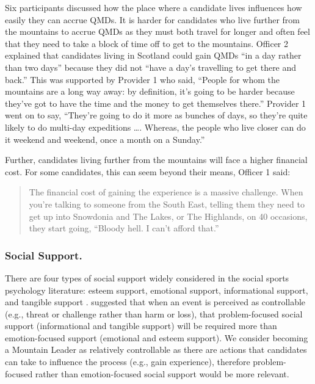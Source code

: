 \documentclass[
  12pt,
  a4paper,
]{book}
\begin{document}
Six participants discussed how the place where a candidate lives influences how easily they can accrue QMDs. It is harder for candidates who live further from the mountains to accrue QMDs as they must both travel for longer and often feel that they need to take a block of time off to get to the mountains. Officer 2 explained that candidates living in Scotland could gain QMDs ``in a day rather than two days'' because they did not ``have a day's travelling to get there and back.'' This was supported by Provider 1 who said, ``People for whom the mountains are a long way away: by definition, it's going to be harder because they've got to have the time and the money to get themselves there.'' Provider 1 went on to say, ``They're going to do it more as bunches of days, so they're quite likely to do multi-day expeditions \ldots. Whereas, the people who live closer can do it weekend and weekend, once a month on a Sunday.''

Further, candidates living further from the mountains will face a higher financial cost. For some candidates, this can seem beyond their means, Officer 1 said:

\begin{quote}
The financial cost of gaining the experience is a massive challenge. When you're talking to someone from the South East, telling them they need to get up into Snowdonia and The Lakes, or The Highlands, on 40 occasions, they start going, ``Bloody hell. I can't afford that.''
\end{quote}

\hypertarget{qual-gta-social-support}{%
\subsubsection{Social Support.}\label{qual-gta-social-support}}

There are four types of social support widely considered in the social sports psychology literature: esteem support, emotional support, informational support, and tangible support \citep[@][]{Cutrona1990a, Cutrona1990b, Freeman2010, Freeman2014, Rees2007a, Rees2007}. \citet{Cutrona1990a} suggested that when an event is perceived as controllable (e.g., threat or challenge rather than harm or loss), that problem-focused social support (informational and tangible support) will be required more than emotion-focused support (emotional and esteem support). We consider becoming a Mountain Leader as relatively controllable as there are actions that candidates can take to influence the process (e.g., gain experience), therefore problem-focused rather than emotion-focused social support would be more relevant.
\end{document}
